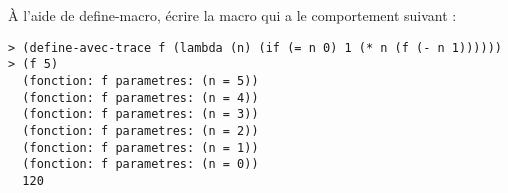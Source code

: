 \begin{Exercise}[title={Macro trace}]
À l'aide de define-macro, écrire la macro
 qui a le comportement suivant :

\begin{verbatim}
> (define-avec-trace f (lambda (n) (if (= n 0) 1 (* n (f (- n 1))))))
> (f 5)
  (fonction: f parametres: (n = 5))
  (fonction: f parametres: (n = 4))
  (fonction: f parametres: (n = 3))
  (fonction: f parametres: (n = 2))
  (fonction: f parametres: (n = 1))
  (fonction: f parametres: (n = 0))
  120
\end{verbatim}
\end{Exercise}